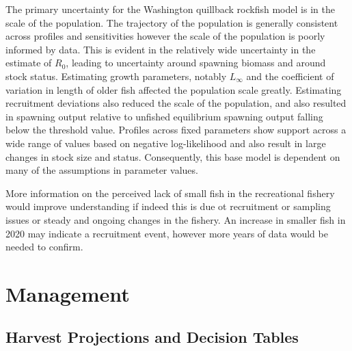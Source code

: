 \documentclass[11pt,
  english,
  a4paper,
]{article}
\begin{document}
The primary uncertainty for the Washington quillback rockfish model is in the scale of the population. The trajectory of the population is generally consistent across profiles and sensitivities however the scale of the population is poorly informed by data. This is evident in the relatively wide uncertainty in the estimate of {\(R_0\)\leavevmode\tagmcend\tagstructend}, leading to uncertainty around spawning biomass and around stock status. Estimating growth parameters, notably {\(L_{\infty}\)\leavevmode\tagmcend\tagstructend} and the coefficient of variation in length of older fish affected the population scale greatly. Estimating recruitment deviations also reduced the scale of the population, and also resulted in spawning output relative to unfished equilibrium spawning output falling below the threshold value. Profiles across fixed parameters show support across a wide range of values based on negative log-likelihood and also result in large changes in stock size and status. Consequently, this base model is dependent on many of the assumptions in parameter values.

\leavevmode\tagmcend\tagstructend\par


More information on the perceived lack of small fish in the recreational fishery would improve understanding if indeed this is due ot recruitment or sampling issues or steady and ongoing changes in the fishery. An increase in smaller fish in 2020 may indicate a recruitment event, however more years of data would be needed to confirm.

\leavevmode\tagmcend\tagstructend\par


\hypertarget{management}{%
\section{Management}\label{management}}

\leavevmode\tagmcend\tagstructend


\hypertarget{harvest-projections-and-decision-tables}{%
\subsection{Harvest Projections and Decision Tables}\label{harvest-projections-and-decision-tables}}
\end{document}

